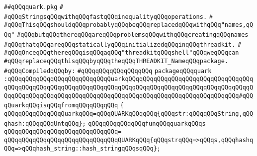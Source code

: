 \label{src/lib/x-kit/style/quark.pkg}
\verb|##qQQqquark.pkg|\newline
\verb|#|\newline
\verb|#qQQqStringsqQQqwithqQQqfastqQQqinequalityqQQqoperations.|\newline
\verb|#|\newline
\verb|#qQQqThisqQQqshouldqQQqprobablyqQQqbeqQQqreplacedqQQqwithqQQq"names,qQQq"|\newline
\verb|#qQQqbutqQQqthereqQQqareqQQqproblemsqQQqwithqQQqcreatingqQQqnames|\newline
\verb|#qQQqthatqQQqareqQQqstaticallyqQQqinitializedqQQqinqQQqthreadkit.|\newline
\verb|#|\newline
\verb|#qQQqOnceqQQqthereqQQqisqQQqaqQQq"threadkitqQQqshell"qQQqweqQQqcan|\newline
\verb|#qQQqreplaceqQQqthisqQQqbyqQQqtheqQQqTHREADKIT_NameqQQqpackage.|\newline
\newline
\verb|#qQQqCompiledqQQqby:|\newline
\verb|#qQQqqQQqqQQqqQQqqQQq|\newline
\newline
\newline
\newline
\newline
\newline
\verb|packageqQQqquark|\newline
\verb|:qQQqqQQqqQQqqQQqqQQqqQQqqQQqQuarkqQQqqQQqqQQqqQQqqQQqqQQqqQQqqQQqqQQqqQQqqQQqqQQqqQQqqQQqqQQqqQQqqQQqqQQqqQQqqQQqqQQqqQQqqQQqqQQqqQQqqQQqqQQqqQQqqQQqqQQqqQQqqQQqqQQqqQQqqQQqqQQqqQQqqQQqqQQqqQQqqQQqqQQqqQQq#qQQqQuarkqQQqisqQQqfromqQQqqQQqqQQq|\newline
\verb|{|\newline
\verb|qQQqqQQqqQQqqQQqQuarkqQQq=qQQqQUARKqQQqqQQq{qQQqstr:qQQqqQQqString,qQQqhash:qQQqqQQqUntqQQq};|\newline
\newline
\verb|qQQqqQQqqQQqqQQqfunqQQqquarkqQQqs|\newline
\verb|qQQqqQQqqQQqqQQqqQQqqQQqqQQqqQQq=|\newline
\verb|qQQqqQQqqQQqqQQqqQQqqQQqqQQqqQQqQUARKqQQq{qQQqstrqQQq=>qQQqs,qQQqhashqQQq=>qQQqhash_string::hash_stringqQQqsqQQq};|\newline
\newline
